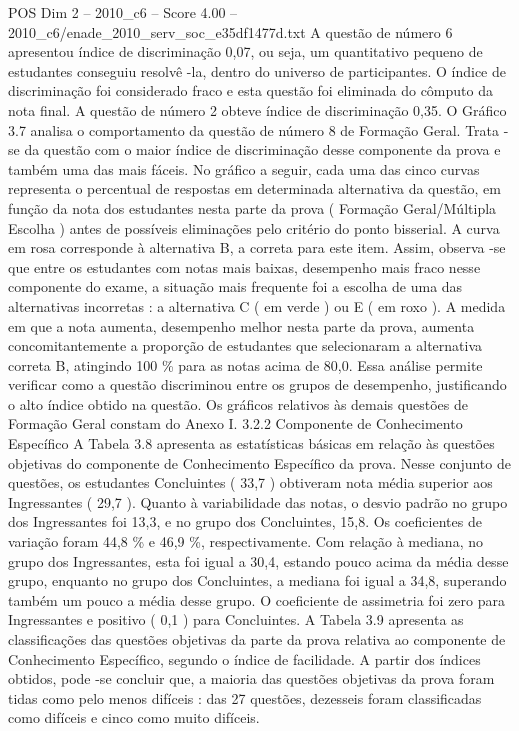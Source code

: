 \begin{textsample}{POS Dim 2 – 2010\_c6 – Score 4.00 – 2010\_c6/enade\_2010\_serv\_soc\_e35df1477d.txt}
A questão de número 6 apresentou índice de discriminação 0,07, ou seja, um quantitativo pequeno de estudantes conseguiu resolvê -la, dentro do universo de participantes.
O índice de discriminação foi considerado fraco e esta questão foi eliminada do cômputo da nota final.
A questão de número 2 obteve índice de discriminação 0,35.
O Gráfico 3.7 analisa o comportamento da questão de número 8 de Formação Geral.
Trata -se da questão com o maior índice de discriminação desse componente da prova e também uma das mais fáceis.
No gráfico a seguir, cada uma das cinco curvas representa o percentual de respostas em determinada alternativa da questão, em função da nota dos estudantes nesta parte da prova ( Formação Geral/Múltipla Escolha ) antes de possíveis eliminações pelo critério do ponto bisserial.
A curva em rosa corresponde à alternativa B, a correta para este item.
Assim, observa -se que entre os estudantes com notas mais baixas, desempenho mais fraco nesse componente do exame, a situação mais frequente foi a escolha de uma das alternativas incorretas : a alternativa C ( em verde ) ou E ( em roxo ).
A medida em que a nota aumenta, desempenho melhor nesta parte da prova, aumenta concomitantemente a proporção de estudantes que selecionaram a alternativa correta B, atingindo 100 \% para as notas acima de 80,0.
Essa análise permite verificar como a questão discriminou entre os grupos de desempenho, justificando o alto índice obtido na questão.
Os gráficos relativos às demais questões de Formação Geral constam do Anexo I. 3.2.2 Componente de Conhecimento Específico A Tabela 3.8 apresenta as estatísticas básicas em relação às questões objetivas do componente de Conhecimento Específico da prova.
Nesse conjunto de questões, os estudantes Concluintes ( 33,7 ) obtiveram nota média superior aos Ingressantes ( 29,7 ).
Quanto à variabilidade das notas, o desvio padrão no grupo dos Ingressantes foi 13,3, e no grupo dos Concluintes, 15,8.
Os coeficientes de variação foram 44,8 \% e 46,9 \%, respectivamente.
Com relação à mediana, no grupo dos Ingressantes, esta foi igual a 30,4, estando pouco acima da média desse grupo, enquanto no grupo dos Concluintes, a mediana foi igual a 34,8, superando também um pouco a média desse grupo.
O coeficiente de assimetria foi zero para Ingressantes e positivo ( 0,1 ) para Concluintes.
A Tabela 3.9 apresenta as classificações das questões objetivas da parte da prova relativa ao componente de Conhecimento Específico, segundo o índice de facilidade.
A partir dos índices obtidos, pode -se concluir que, a maioria das questões objetivas da prova foram tidas como pelo menos difíceis : das 27 questões, dezesseis foram classificadas como difíceis e cinco como muito difíceis.

\end{textsample}
